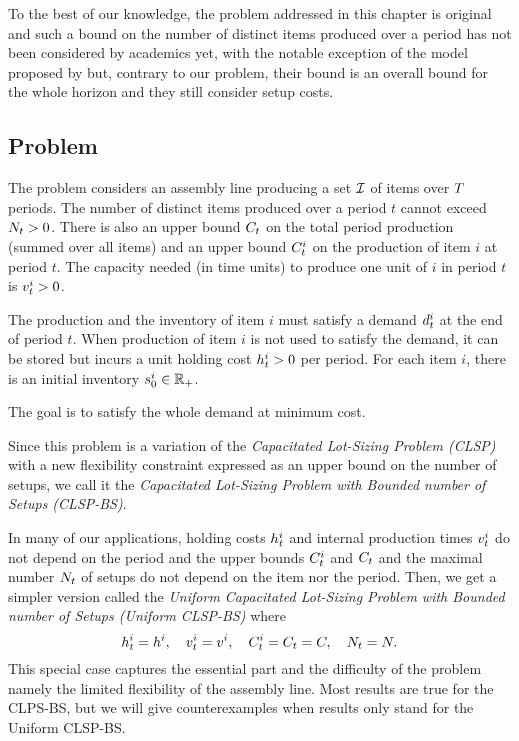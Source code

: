 To the best of our knowledge, the problem addressed in this chapter is original and such a bound on the number of distinct items produced over a period has not been considered by academics yet, with the notable exception of the model proposed by \citet{Rubaszewski2011} but, contrary to our problem, their bound is an overall bound for the whole horizon and they still consider setup costs.


\subsection{Problem}
\label{sec:PDP:deterministic:introduction:problem}


The problem considers an assembly line producing a set $\mathcal{I}$ of items over $T$ periods.
The number of distinct items produced over a period $t$ cannot exceed $N_t>0$.
There is also an upper bound $C_t$ on the total period production (summed over all items) and an upper bound $C_t^i$ on the production of item $i$ at period $t$.
The capacity needed (in time units) to produce one unit of $i$ in period $t$ is $v_t^i>0$.


The production and the inventory of item $i$ must satisfy a demand $d_t^i$ at the end of period $t$.
When production of item $i$ is not used to satisfy the demand, it can be stored but incurs a unit holding cost $h_t^i>0$ per period.
For each item $i$, there is an initial inventory $s_0^i\in\mathbb{R}_+$.


The goal is to satisfy the whole demand at minimum cost.


Since this problem is a variation of the \emph{Capacitated Lot-Sizing Problem (CLSP)} with a new flexibility constraint expressed as an upper bound on the number of setups, we call it the \emph{Capacitated Lot-Sizing Problem with Bounded number of Setups (CLSP-BS)}.


In many of our applications, holding costs $h_t^i$ and internal production times $v_t^i$ do not depend on the period and the upper bounds $C_t^i$ and $C_t$ and the maximal number $N_t$ of setups do not depend on the item nor the period.
Then, we get a simpler version called the \emph{Uniform Capacitated Lot-Sizing Problem with Bounded number of Setups (Uniform CLSP-BS)} where
\begin{equation}
  h_t^i=h^i,\quad
  v_t^i=v^i,\quad
  C_t^i=C_t=C,\quad
  N_t=N.
\end{equation}
This special case captures the essential part and the difficulty of the problem namely the limited flexibility of the assembly line.
Most results are true for the CLPS-BS, but we will give counterexamples when results only stand for the Uniform CLSP-BS.


